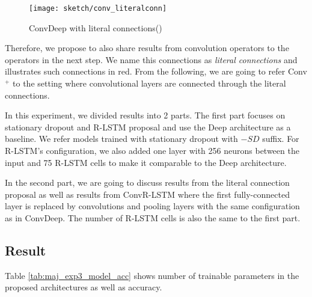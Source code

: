 

 \begin{figure}[!htb]
\centering
\texttt{[image: sketch/conv\_literalconn]}
\caption{ConvDeep with literal connections()} 
\label{fig:conv_literalconn}
\end{figure}

Therefore, we propose to also share results from convolution operators to the operators in the next step. We name this connections as \textit{literal connections} and \addfigure{\ref{fig:conv_literalconn}} illustrates such connections in red. From the following, we are going to refer Conv$^+$ to the setting where convolutional layers are connected through the literal connections. 

In this experiment, we divided results into 2 parts. The first part focuses on stationary dropout and R-LSTM proposal and use the Deep architecture as a baseline. We refer models trained with stationary dropout with $-SD$ suffix. For R-LSTM's configuration, we also added one layer with 256 neurons between the input and 75 R-LSTM cells to make it comparable to the Deep architecture.  

In the second part, we are going to discuss results from the literal connection proposal as well as results from ConvR-LSTM where the first fully-connected layer is replaced by convolutions and pooling layers with the same configuration as in ConvDeep. The number of R-LSTM cells is also the same to the first part. 



\subsection{Result}
Table \ref{tab:maj_exp3_model_acc} shows number of trainable parameters in the proposed architectures as well as accuracy.

